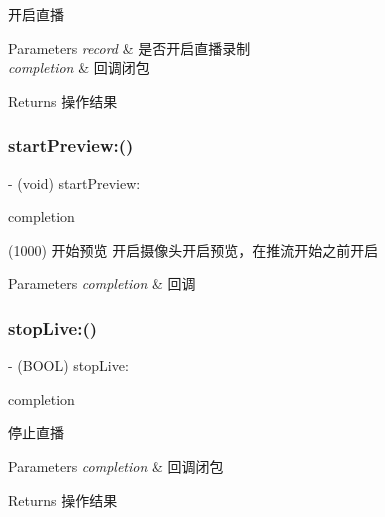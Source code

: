 开启直播 
\begin{DoxyParams}{Parameters}
{\em record} & 是否开启直播录制 \\
\hline
{\em completion} & 回调闭包 \\
\hline
\end{DoxyParams}
\begin{DoxyReturn}{Returns}
操作结果 
\end{DoxyReturn}
\mbox{\label{interface_c_c_streamer_basic_a719419e4a1d870d984373391e67eec27}} 
\subsubsection{\texorpdfstring{start\+Preview\+:()}{startPreview:()}}
{\footnotesize\ttfamily -\/ (void) start\+Preview\+: \begin{DoxyParamCaption}\item[{(C\+C\+Comletion\+Block)}]{completion }\end{DoxyParamCaption}}

(1000)  开始预览  开启摄像头开启预览，在推流开始之前开启 
\begin{DoxyParams}{Parameters}
{\em completion} & 回调 \\
\hline
\end{DoxyParams}
\mbox{\label{interface_c_c_streamer_basic_a1371108bb07a2af44edfda771ab62683}} 
\subsubsection{\texorpdfstring{stop\+Live\+:()}{stopLive:()}}
{\footnotesize\ttfamily -\/ (B\+O\+OL) stop\+Live\+: \begin{DoxyParamCaption}\item[{(C\+C\+Comletion\+Block)}]{completion }\end{DoxyParamCaption}}

停止直播 
\begin{DoxyParams}{Parameters}
{\em completion} & 回调闭包 \\
\hline
\end{DoxyParams}
\begin{DoxyReturn}{Returns}
操作结果 
\end{DoxyReturn}
\mbox{\label{interface_c_c_streamer_basic_a67d4c1109da3c868368a0af1dc66ddf5}} 
